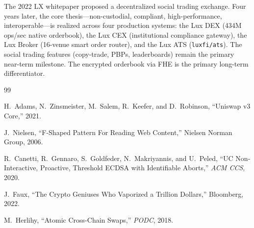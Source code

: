 \documentclass[11pt,a4paper]{article}
\begin{document}
The 2022 LX whitepaper proposed a decentralized social trading
exchange. Four years later, the core thesis---non-custodial,
compliant, high-performance, interoperable---is realized across
four production systems: the Lux DEX (434M ops/sec native
orderbook), the Lux CEX (institutional compliance gateway), the
Lux Broker (16-venue smart order router), and the Lux ATS
(\texttt{luxfi/ats}). The social trading
features (copy-trade, PBPs, leaderboards) remain the primary
near-term milestone. The encrypted orderbook via FHE is the
primary long-term differentiator.


\begin{thebibliography}{99}

H.~Adams, N.~Zinsmeister, M.~Salem, R.~Keefer, and D.~Robinson,
``Uniswap v3 Core,'' 2021.

J.~Nielsen, ``F-Shaped Pattern For Reading Web Content,''
Nielsen Norman Group, 2006.

R.~Canetti, R.~Gennaro, S.~Goldfeder, N.~Makriyannis, and
U.~Peled, ``UC Non-Interactive, Proactive, Threshold ECDSA
with Identifiable Aborts,'' \textit{ACM CCS}, 2020.

J.~Faux, ``The Crypto Geniuses Who Vaporized a Trillion
Dollars,'' Bloomberg, 2022.

M.~Herlihy, ``Atomic Cross-Chain Swaps,'' \textit{PODC}, 2018.

\end{thebibliography}
\end{document}
